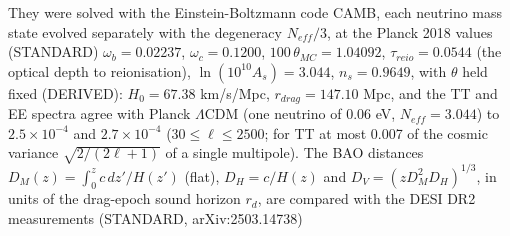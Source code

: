 \documentclass[
  10pt,
]{article}
\begin{document}
They were solved with the Einstein-Boltzmann code CAMB, each neutrino
mass state evolved separately with the degeneracy \(N_{eff}/3\), at the
Planck 2018 values (STANDARD) \(\omega_b = 0.02237\),
\(\omega_c = 0.1200\), \(100\,\theta_{MC} = 1.04092\),
\(\tau_{reio} = 0.0544\) (the optical depth to reionisation),
\(\ln(10^{10}A_s) = 3.044\), \(n_s = 0.9649\), with \(\theta\) held
fixed (DERIVED): \(H_0 = 67.38\) km/s/Mpc, \(r_{drag} = 147.10\) Mpc,
and the TT and EE spectra agree with Planck \(\Lambda\)CDM (one neutrino
of \(0.06\) eV, \(N_{eff} = 3.044\)) to \(2.5\times10^{-4}\) and
\(2.7\times10^{-4}\) (\(30 \le \ell \le 2500\); for TT at most 0.007 of
the cosmic variance \(\sqrt{2/(2\ell + 1)}\) of a single multipole). The
BAO distances \(D_M(z) = \int_0^z c\,dz'/H(z')\) (flat),
\(D_H = c/H(z)\) and \(D_V = (zD_M^2D_H)^{1/3}\), in units of the
drag-epoch sound horizon \(r_d\), are compared with the DESI DR2
measurements (STANDARD, arXiv:2503.14738)
\end{document}
